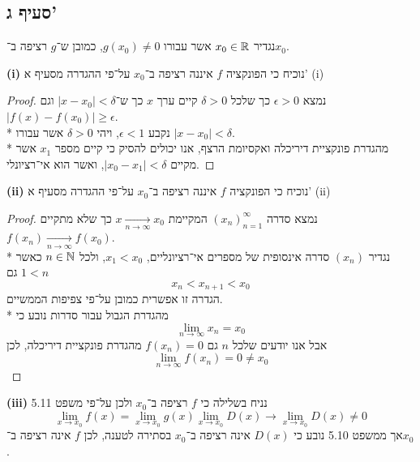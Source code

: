 \subsection{סעיף ג'}
נגדיר $x_0 \in \mathbb{R}$ אשר עבורו $g(x_0) \ne 0$, כמובן ש־$g$ רציפה ב־$x_0$.

\textbf{(i)}
נוכיח כי הפונקציה $f$ איננה רציפה ב־$x_0$ על־פי ההגדרה מסעיף א' (i)
\begin{proof}
	נמצא $\epsilon > 0$ כך שלכל $\delta > 0$ קיים ערך $x$ כך ש־$|x - x_0| < \delta$ וגם $|f(x) - f(x_0)| \ge \epsilon$. \\*
	נקבע $\epsilon < 1$, ויהי $\delta > 0$ אשר עבורו $|x - x_0| < \delta$. \\*
	מהגדרת פונקציית דיריכלה ואקסיומת הרצף, אנו יכולים להסיק כי קיים מספר $x_1$ אשר מקיים $|x_0 - x_1| < \delta$, ואשר הוא אי־רציונלי.
\end{proof}

\textbf{(ii)}
נוכיח כי הפונקציה $f$ איננה רציפה ב־$x_0$ על־פי ההגדרה מסעיף א' (ii)
\begin{proof}
	נמצא סדרה ${(x_n)}_{n = 1}^\infty$ המקיימת $x \underset{n \to \infty}{\rightarrow} x_0$ כך שלא מתקיים $f(x_n) \underset{n \to \infty}{\rightarrow} f(x_0)$. \\*
	נגדיר $(x_n)$ סדרה אינסופית של מספרים אי־רציונליים, $x_1 < x_0$, ולכל $n \in \mathbb{N}$ כאשר $1 < n$ גם
	\[
		x_n < x_{n + 1} < x_0
	\]
	הגדרה זו אפשרית כמובן על־פי צפיפות הממשיים. \\*
	מהגדרת הגבול עבור סדרות נובע כי
	\[
		\lim_{n \to \infty} x_n = x_0
	\]
	אבל אנו יודעים שלכל $n$ גם $f(x_n) = 0$ מהגדרת פונקציית דיריכלה, לכן
	\[
		\lim_{n \to \infty} f(x_n) = 0 \ne x_0
	\]
\end{proof}

\textbf{(iii)}
נניח בשלילה כי $f$ רציפה ב־$x_0$ ולכן על־פי משפט 5.11
\[
	\lim_{x \to x_0} f(x)
	= \lim_{x \to x_0} g(x) \lim_{x \to x_0} D(x)
	\rightarrow \lim_{x \to x_0} D(x) \ne 0
\]
אך ממשפט 5.10 נובע כי $D(x)$ אינה רציפה ב־$x_0$ בסתירה לטענה, לכן $f$ אינה רציפה ב־$x_0$.

